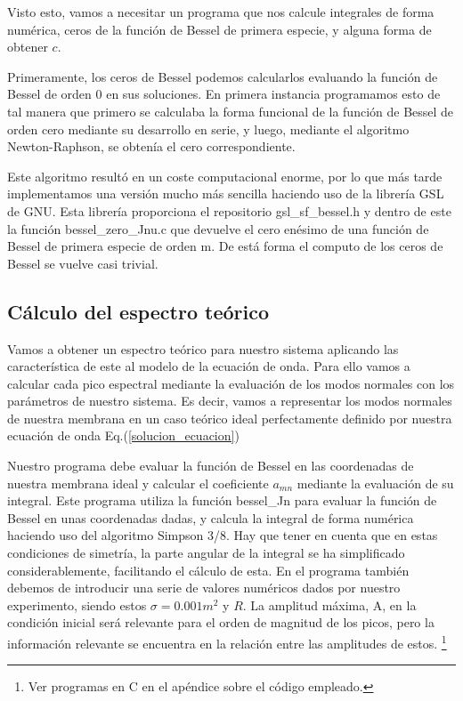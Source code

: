 \documentclass[journal, a4paper,onecolumn]{IEEEtran}
\newcommand{\equationref}[1]{Eq.(\ref{#1})}
\begin{document}
Visto esto, vamos a necesitar un programa que nos calcule integrales de forma numérica, ceros de la función de Bessel de primera especie, y alguna forma de obtener $c$.\newline

Primeramente, los ceros de Bessel podemos calcularlos evaluando la función de Bessel de orden 0 en sus soluciones. En primera instancia programamos esto de tal manera que primero se calculaba la forma funcional de la función de Bessel de orden cero mediante su desarrollo en serie, y luego, mediante el algoritmo Newton-Raphson, se obtenía el cero correspondiente.\newline

Este algoritmo resultó en un coste computacional enorme, por lo que más tarde implementamos una versión mucho más sencilla haciendo uso de la librería GSL de GNU. Esta librería proporciona el repositorio gsl\_sf\_bessel.h y dentro de este la función bessel\_zero\_Jnu.c que devuelve el cero enésimo de una función de Bessel de primera especie de orden m. De está forma el computo de los ceros de Bessel se vuelve casi trivial. \newline



\subsection{Cálculo del espectro teórico}
Vamos a obtener un espectro teórico para nuestro sistema aplicando las característica de este al modelo de la ecuación de onda. Para ello vamos a calcular cada pico espectral mediante la evaluación de los modos normales con los parámetros de nuestro sistema. Es decir, vamos a representar los modos normales de nuestra membrana en un caso teórico ideal perfectamente definido por nuestra ecuación de onda \equationref{solucion_ecuacion}
\newline

 Nuestro programa debe evaluar la función de Bessel en las coordenadas de nuestra membrana ideal y calcular el coeficiente $a_{mn}$ mediante la evaluación de su integral. Este programa utiliza la función bessel\_Jn para evaluar la función de Bessel en unas coordenadas dadas, y calcula la integral de forma numérica haciendo uso del algoritmo Simpson 3/8. Hay que tener en cuenta que en estas condiciones de simetría, la parte angular de la integral se ha simplificado considerablemente, facilitando el cálculo de esta. En el programa también debemos de introducir una serie de valores numéricos dados por nuestro experimento, siendo estos $\sigma = 0.001 m^2$ y $R$. La amplitud máxima, A, en la condición inicial será relevante para el orden de magnitud de los picos, pero la información relevante se encuentra en la relación entre las amplitudes de estos. \footnote{ Ver programas en C en el apéndice sobre el código empleado.}
\newline
\end{document}
